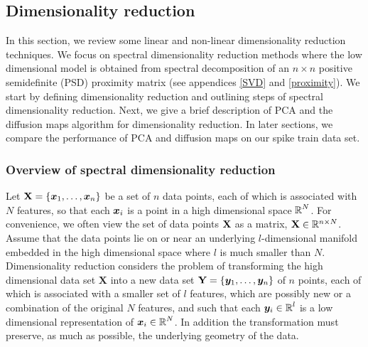 
\subsection{Dimensionality reduction}\label{spectral decomp}
In this section, we review some linear and non-linear dimensionality reduction techniques. We focus on spectral dimensionality reduction methods where the low dimensional model is obtained from spectral decomposition of an $n \times n$ positive semidefinite (PSD) proximity matrix (see appendices \ref{SVD} and \ref{proximity}). We start by defining dimensionality reduction and outlining steps of spectral dimensionality reduction. Next, we give a brief description of PCA and the diffusion maps algorithm for dimensionality reduction. In later sections, we compare the performance of PCA and diffusion maps on our spike train data set.


\subsubsection{Overview of spectral dimensionality reduction}
Let $\textbf{X} = \displaystyle \{\boldsymbol{x}_{1}, \ldots , \boldsymbol{x}_{n} \}$ be a set of $n$ data points, each of which is associated with $N$ features, so that each $\boldsymbol{x}_{i}$ is a point in a high dimensional space $\operatorname{\mathbb{R}}^{N}$. For convenience, we often view the set of data points $\textbf{X}$ as a matrix, $\textbf{X} \in \mathbb{R}^{n \times N}$. Assume that the data points lie on or near an underlying $l$-dimensional manifold embedded in the high dimensional space where $l$ is much smaller than $N$. Dimensionality reduction considers the problem of  transforming the high dimensional data set $\textbf{X}$ into a new data set $\textbf{Y} = \displaystyle \{ \boldsymbol{y}_{1}, \ldots, \boldsymbol{y}_{n} \}$  of $n$ points, each of which is associated with a smaller set of $l$ features, which are possibly new or a combination of the original $N$ features, and such that each $\boldsymbol{y}_{i} \in \operatorname{\mathbb{R}}^{l}$ is a low dimensional representation of $\boldsymbol{x}_{i} \in \operatorname{\mathbb{R}}^{N}$. In addition the transformation must preserve, as much as possible, the underlying geometry of the data.


